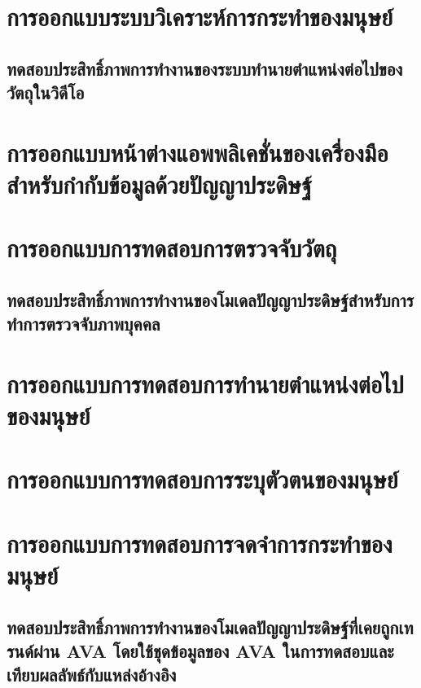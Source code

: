 \section{การออกแบบระบบวิเคราะห์การกระทำของมนุษย์}
\subsection{ทดสอบประสิทธิ์ภาพการทำงานของระบบทำนายตำแหน่งต่อไปของวัตถุในวิดีโอ}


\clearpage
\section{การออกแบบหน้าต่างแอพพลิเคชั่นของเครื่องมือสำหรับกำกับข้อมูลด้วยปัญญาประดิษฐ์}


\clearpage
\section{การออกแบบการทดสอบการตรวจจับวัตถุ}
\subsection{ทดสอบประสิทธิ์ภาพการทำงานของโมเดลปัญญาประดิษฐ์สำหรับการทำการตรวจจับภาพบุคคล}


\section{การออกแบบการทดสอบการทำนายตำแหน่งต่อไปของมนุษย์}
\section{การออกแบบการทดสอบการระบุตัวตนของมนุษย์}

\section{การออกแบบการทดสอบการจดจำการกระทำของมนุษย์}
\subsection{ทดสอบประสิทธิ์ภาพการทำงานของโมเดลปัญญาประดิษฐ์ที่เคยถูกเทรนด์ผ่าน AVA โดยใช้ชุดข้อมูลของ AVA ในการทดสอบและเทียบผลลัพธ์กับแหล่งอ้างอิง}





